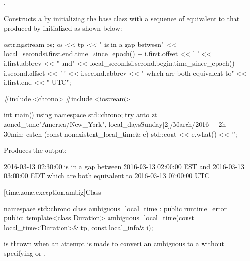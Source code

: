 \begin{itemdescr}
\pnum
\requires {}.

\pnum
\effects
Constructs a 
by initializing the base class with a sequence of 
equivalent to that produced by 
initialized as shown below:

\begin{codeblock}
ostringstream os;
os << tp << " is in a gap between\n"
   << local_seconds{i.first.end.time_since_epoch()} + i.first.offset << ' '
   << i.first.abbrev << " and\n"
   << local_seconds{i.second.begin.time_since_epoch()} + i.second.offset << ' '
   << i.second.abbrev
   << " which are both equivalent to\n"
   << i.first.end << " UTC";
\end{codeblock}

\pnum
\begin{example}
\begin{codeblock}
#include <chrono>
#include <iostream>

int main() {
  using namespace std::chrono;
  try {
    auto zt = zoned_time{"America/New_York",
                         local_days{Sunday[2]/March/2016} + 2h + 30min};
  } catch (const nonexistent_local_time& e) {
    std::cout << e.what() << '\n';
  }
}
\end{codeblock}

Produces the output:

\begin{codeblock}
2016-03-13 02:30:00 is in a gap between
2016-03-13 02:00:00 EST and
2016-03-13 03:00:00 EDT which are both equivalent to
2016-03-13 07:00:00 UTC
\end{codeblock}
\end{example}
\end{itemdescr}

[time.zone.exception.ambig]{Class }

\begin{codeblock}
namespace std::chrono {
  class ambiguous_local_time : public runtime_error {
  public:
    template<class Duration>
      ambiguous_local_time(const local_time<Duration>& tp, const local_info& i);
  };
}
\end{codeblock}

\pnum
{} is thrown when
an attempt is made
to convert an ambiguous  to a 
without specifying  or .


